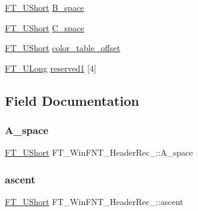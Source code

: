 \begin{DoxyCompactItemize}
\item 
\hyperlink{fttypes_8h_a937f6c17cf5ffd09086d8610c37b9f58}{F\+T\+\_\+\+U\+Short} \hyperlink{struct_f_t___win_f_n_t___header_rec___aabd41a485124b6c4220fc4622525608e}{B\+\_\+space}
\item 
\hyperlink{fttypes_8h_a937f6c17cf5ffd09086d8610c37b9f58}{F\+T\+\_\+\+U\+Short} \hyperlink{struct_f_t___win_f_n_t___header_rec___a1173b4d5c809db01edf4ff2185e1d43b}{C\+\_\+space}
\item 
\hyperlink{fttypes_8h_a937f6c17cf5ffd09086d8610c37b9f58}{F\+T\+\_\+\+U\+Short} \hyperlink{struct_f_t___win_f_n_t___header_rec___a83fa51bfd7fe814f8264416204701c60}{color\+\_\+table\+\_\+offset}
\item 
\hyperlink{fttypes_8h_a4fac88bdba78eb76b505efa6e4fbf3f5}{F\+T\+\_\+\+U\+Long} \hyperlink{struct_f_t___win_f_n_t___header_rec___af01de9742608fb7a2a603d062f3783e3}{reserved1} \mbox{[}4\mbox{]}
\end{DoxyCompactItemize}


\subsection{Field Documentation}
\mbox{\label{struct_f_t___win_f_n_t___header_rec___ad97f5f84ac213c1fb59ceeafc689f381}} 
\subsubsection{\texorpdfstring{A\+\_\+space}{A\_space}}
{\footnotesize\ttfamily \hyperlink{fttypes_8h_a937f6c17cf5ffd09086d8610c37b9f58}{F\+T\+\_\+\+U\+Short} F\+T\+\_\+\+Win\+F\+N\+T\+\_\+\+Header\+Rec\+\_\+\+::\+A\+\_\+space}

\mbox{\label{struct_f_t___win_f_n_t___header_rec___a99125a3ce627cd8295c50c6019ec2f42}} 
\subsubsection{\texorpdfstring{ascent}{ascent}}
{\footnotesize\ttfamily \hyperlink{fttypes_8h_a937f6c17cf5ffd09086d8610c37b9f58}{F\+T\+\_\+\+U\+Short} F\+T\+\_\+\+Win\+F\+N\+T\+\_\+\+Header\+Rec\+\_\+\+::ascent}

